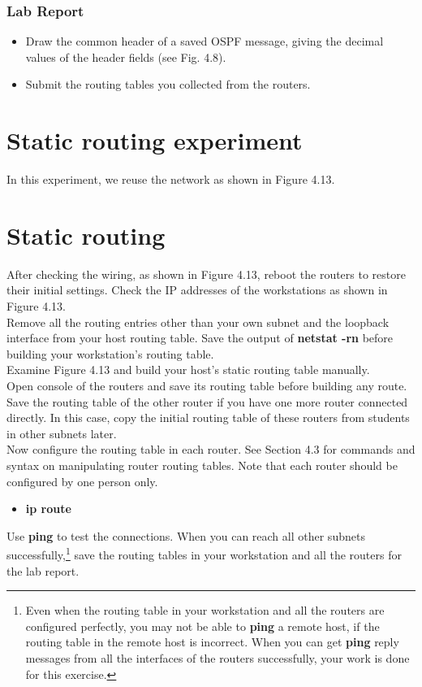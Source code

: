 \documentclass{../UTNetLab}
\begin{document}
    \subsubsection*{Lab Report}
    \begin{itemize}
        \setlength{\itemindent}{0pt}
        \item Draw the common header of a saved OSPF message, giving the decimal values of the header fields (see Fig. 4.8).
        \item Submit the routing tables you collected from the routers.
    \end{itemize}

\section*{Static routing experiment}
    In this experiment, we reuse the network as shown in Figure 4.13.
\section{Static routing}
    After checking the wiring, as shown in Figure 4.13, reboot the routers to restore their initial settings.
    Check the IP addresses of the workstations as shown in Figure 4.13. \\
    Remove all the routing entries other than your own subnet and the loopback interface from your host routing table.
    Save the output of \textbf{netstat -rn} before building your workstation’s routing table. \\
    Examine Figure 4.13 and build your host’s static routing table manually. \\
    Open console of the routers and save its routing table before building any route.
    Save the routing table of the other router if you have one more router connected directly.
    In this case, copy the initial routing table of these routers from students in other subnets later. \\
    Now configure the routing table in each router.
    See Section 4.3 for commands and syntax on manipulating router routing tables.
    Note that each router should be configured by one person only. \\
    \begin{itemize}
        \item \textbf{ip route} \textit{}
    \end{itemize}
    Use \textbf{ping} to test the connections.
    When you can reach all other subnets successfully,\footnote{Even when the routing table in your workstation and all the routers are configured perfectly, you may not be able to \textbf{ping} a remote host, if the routing table in the remote host is incorrect.
    When you can get \textbf{ping} reply messages from all the interfaces of the routers successfully, your work is done for this exercise.} save the routing tables in your workstation and all the routers for the lab report.
\end{document}
